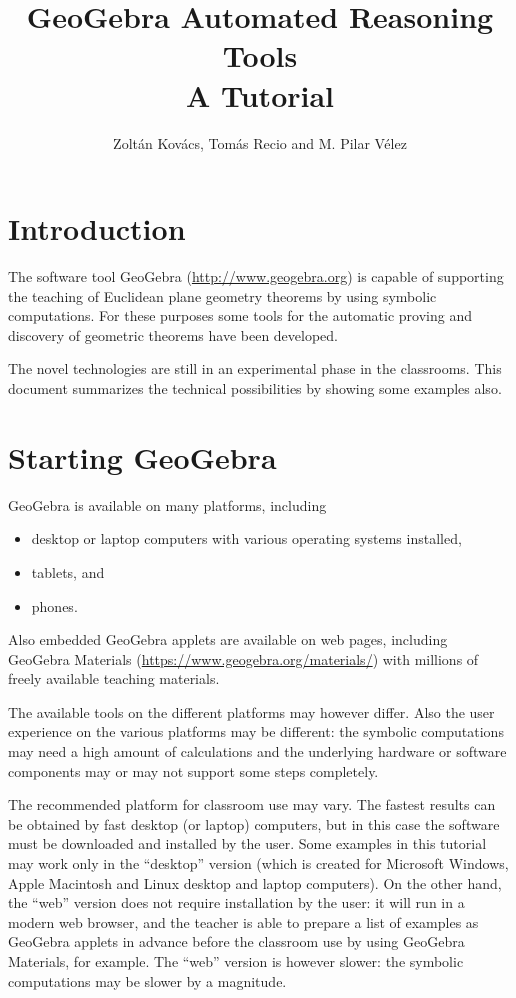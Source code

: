 \documentclass{article}
\title{GeoGebra Automated Reasoning Tools\\ \large A Tutorial}
\author{Zolt\'an Kov\'acs, Tom\'as Recio and M. Pilar V\'elez}
\begin{document}

\maketitle

\section{Introduction}

The software tool GeoGebra (\url{http://www.geogebra.org}) is capable of supporting the teaching of Euclidean plane geometry theorems by using symbolic computations. For these purposes some tools for the automatic proving and discovery of geometric theorems have been developed.

The novel technologies are still in an experimental phase in the classrooms. This document summarizes the technical possibilities by showing some examples also.

\section{Starting GeoGebra}

GeoGebra is available on many platforms, including
\begin{itemize}
    \item desktop or laptop computers with various operating systems installed,
    \item tablets, and
    \item phones.
\end{itemize}
Also embedded GeoGebra applets are available on web pages, including GeoGebra Materials (\url{https://www.geogebra.org/materials/}) with millions of freely available teaching materials.

The available tools on the different platforms may however differ. Also the user experience on the various platforms may be different: the symbolic computations may need a high amount of calculations and the underlying hardware or software components may or may not support some steps completely.

The recommended platform for classroom use may vary. The fastest results can be obtained by fast desktop (or laptop) computers, but in this case the software must be downloaded and installed by the user. Some examples in this tutorial may work only in the ``desktop'' version (which is created for Microsoft Windows, Apple Macintosh and Linux desktop and laptop computers). On the other hand, the ``web'' version does not require installation by the user: it will run in a modern web browser, and the teacher is able to prepare a list of examples as GeoGebra applets in advance before the classroom use by using GeoGebra Materials, for example. The ``web'' version is however slower: the symbolic computations may be slower by a magnitude.
\end{document}
